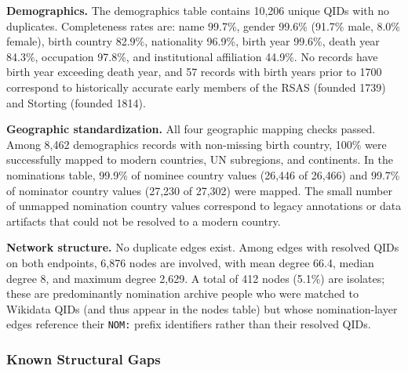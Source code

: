 \documentclass[11pt]{article}
\begin{document}
\textbf{Demographics.} The demographics table contains 10{,}206 unique QIDs with no duplicates. Completeness rates are: name 99.7\%, gender 99.6\% (91.7\% male, 8.0\% female), birth country 82.9\%, nationality 96.9\%, birth year 99.6\%, death year 84.3\%, occupation 97.8\%, and institutional affiliation 44.9\%. No records have birth year exceeding death year, and 57 records with birth years prior to 1700 correspond to historically accurate early members of the RSAS (founded 1739) and Storting (founded 1814).

\textbf{Geographic standardization.} All four geographic mapping checks passed. Among 8{,}462 demographics records with non-missing birth country, 100\% were successfully mapped to modern countries, UN subregions, and continents. In the nominations table, 99.9\% of nominee country values (26{,}446 of 26{,}466) and 99.7\% of nominator country values (27{,}230 of 27{,}302) were mapped. The small number of unmapped nomination country values correspond to legacy annotations or data artifacts that could not be resolved to a modern country.

\textbf{Network structure.} No duplicate edges exist. Among edges with resolved QIDs on both endpoints, 6{,}876 nodes are involved, with mean degree 66.4, median degree 8, and maximum degree 2{,}629. A total of 412 nodes (5.1\%) are isolates; these are predominantly nomination archive people who were matched to Wikidata QIDs (and thus appear in the nodes table) but whose nomination-layer edges reference their \texttt{NOM:} prefix identifiers rather than their resolved QIDs.

\subsubsection{Known Structural Gaps}
\label{sec:gaps}
\end{document}
